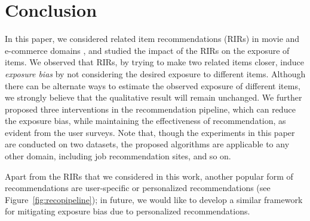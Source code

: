 \section{Conclusion}

In this paper, we considered related item recommendations (RIRs) in movie and e-commerce domains%
, and  
studied the impact of the RIRs on the exposure of items. We observed that RIRs, by trying to make two related items closer, induce {\it exposure bias} by not considering the desired exposure to different items. 
Although there can be alternate ways to estimate the observed exposure of different items, we strongly believe that the qualitative result will remain unchanged. We further proposed three  interventions in the recommendation pipeline, which can reduce the exposure bias, while maintaining the effectiveness of recommendation, as evident from the user surveys. 
Note that, though the experiments in this paper are conducted on two datasets, the proposed algorithms are applicable to any other domain, including job recommendation sites, and so on.


Apart from the RIRs that we considered in this work, another popular form of recommendations are user-specific or 
personalized recommendations (see Figure~\ref{fig:recopipeline}); in future, we would like to develop a similar framework for mitigating exposure bias due to personalized recommendations.



\fi 


